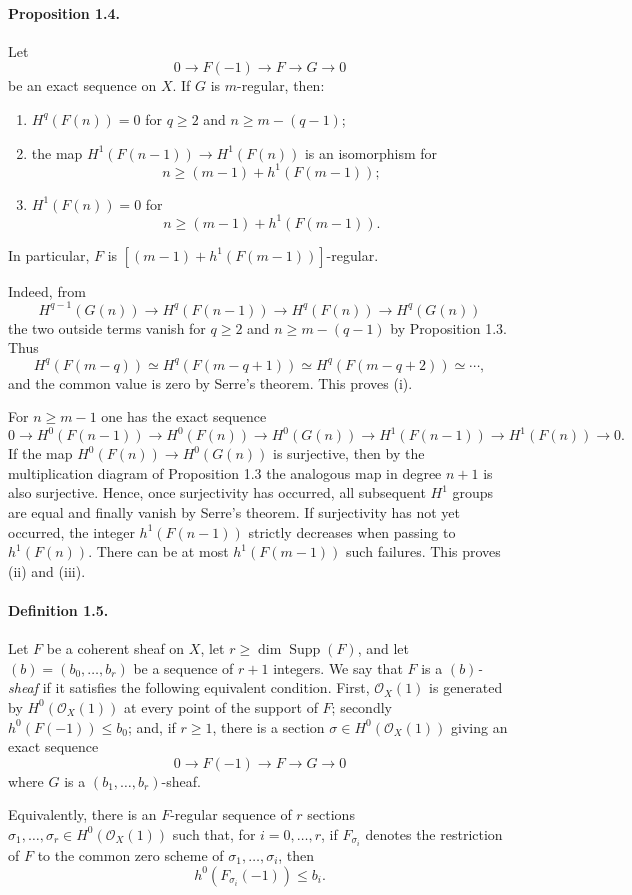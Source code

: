 \documentclass[12pt]{article}
\newcommand{\cO}{\mathcal O}
\begin{document}
\paragraph{Proposition 1.4.}
Let
\[
0\to F(-1)\to F\to G\to0
\]
be an exact sequence on $X$. If $G$ is $m$-regular, then:
\begin{enumerate}[label=\roman*)]
\item $H^q(F(n))=0$ for $q\geq2$ and $n\geq m-(q-1)$;
\item the map $H^1(F(n-1))\to H^1(F(n))$ is an isomorphism for
\[
n\geq (m-1)+h^1(F(m-1));
\]
\item $H^1(F(n))=0$ for
\[
n\geq (m-1)+h^1(F(m-1)).
\]
\end{enumerate}
In particular, $F$ is $[(m-1)+h^1(F(m-1))]$-regular.

Indeed, from
\[
H^{q-1}(G(n))\to H^q(F(n-1))\to H^q(F(n))\to H^q(G(n))
\]
the two outside terms vanish for $q\geq2$ and $n\geq m-(q-1)$ by Proposition 1.3. Thus
\[
H^q(F(m-q))\simeq H^q(F(m-q+1))\simeq H^q(F(m-q+2))\simeq\cdots,
\]
and the common value is zero by Serre's theorem. This proves (i).

For $n\geq m-1$ one has the exact sequence
\[
0\to H^0(F(n-1))\to H^0(F(n))\to H^0(G(n))\to H^1(F(n-1))\to H^1(F(n))\to0.
\]
If the map $H^0(F(n))\to H^0(G(n))$ is surjective, then by the multiplication diagram of Proposition 1.3 the analogous map in degree $n+1$ is also surjective. Hence, once surjectivity has occurred, all subsequent $H^1$ groups are equal and finally vanish by Serre's theorem. If surjectivity has not yet occurred, the integer $h^1(F(n-1))$ strictly decreases when passing to $h^1(F(n))$. There can be at most $h^1(F(m-1))$ such failures. This proves (ii) and (iii).

\paragraph{Definition 1.5.}
Let $F$ be a coherent sheaf on $X$, let $r\geq \dim\operatorname{Supp}(F)$, and let $(b)=(b_0,\ldots,b_r)$ be a sequence of $r+1$ integers. We say that $F$ is a \emph{$(b)$-sheaf} if it satisfies the following equivalent condition. First, $\cO_X(1)$ is generated by $H^0(\cO_X(1))$ at every point of the support of $F$; secondly $h^0(F(-1))\leq b_0$; and, if $r\geq1$, there is a section $\sigma\in H^0(\cO_X(1))$ giving an exact sequence
\[
0\to F(-1)\to F\to G\to0
\]
where $G$ is a $(b_1,\ldots,b_r)$-sheaf.

Equivalently, there is an $F$-regular sequence of $r$ sections $\sigma_1,\ldots,\sigma_r\in H^0(\cO_X(1))$ such that, for $i=0,\ldots,r$, if $F_{\sigma_i}$ denotes the restriction of $F$ to the common zero scheme of $\sigma_1,\ldots,\sigma_i$, then
\[
h^0(F_{\sigma_i}(-1))\leq b_i.
\]
\end{document}
